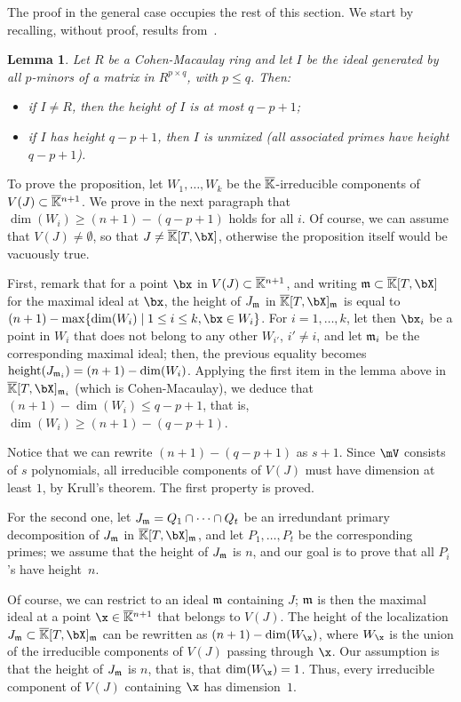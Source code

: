 \documentclass[12pt]{article}
\newtheorem{lemma}[definition]{Lemma}
\begin{document}
The proof in the general case occupies the rest of this section. We start by
recalling, without proof, results from~\cite[Section~6]{EN62}.

\begin{lemma}\label{lemma:EN}
  Let $R$ be a Cohen-Macaulay ring and let $I$ be the ideal generated
  by all $p$-minors of a matrix in $R^{p\times q}$,
  with $p \le q$. Then:
  \begin{itemize}
  \item if $I \ne R$, then the height of $I$ is at most $q-p+1$;
  \item if $I$ has height $q-p+1$, then $I$ is unmixed (all associated
    primes have height $q-p+1$).
\end{itemize}
\end{lemma}

To prove the proposition, let $W_1,\dots,W_k$ be the
$\overline{\mathbb{K}}$-irreducible components of $V(J)\subset \overline{\mathbb{K}}{}^{n+1}$.  We
prove in the next paragraph that $\dim(W_i) \ge (n+1) -(q-p+1)$ holds
for all $i$. Of course, we can assume that $V(J)\ne \emptyset$, so
that $J \ne \KKbar[T,\bX]$, otherwise the proposition itself would be
vacuously true.

First, remark that for a point $\bx$ in $V(J)\subset \overline{\mathbb{K}}{}^{n+1}$,
and writing $\m \subset \KKbar[T,\bX]$ for the maximal ideal at $\bx$,
the height of $J_{\mathfrak{m}}$ in $\KKbar[T,\bX]_\m$ is equal to $(n+1)-\max\{
\dim(W_i) \mid 1 \le i \le k, \bx \in W_i\}$. For $i=1,\dots,k$, let
then $\bx_i$ be a point in $W_i$ that does not belong to any other
$W_{i'}$, $i' \ne i$, and let $\mathfrak{m}_i$ be the corresponding maximal
ideal; then, the previous equality becomes ${\rm
  height}(J_{\mathfrak{m}_i})=(n+1)-\dim(W_i)$.  Applying the first item in the
lemma above in $\KKbar[T,\bX]_{\m_i}$ (which is Cohen-Macaulay), we
deduce that $(n+1)-\dim(W_i) \le q-p+1$, that is, $\dim(W_i) \ge (n+1)
-(q-p+1)$.

Notice that we can rewrite $(n+1)-(q-p+1)$ as $s+1$.  Since $\mV$
consists of $s$ polynomials, all irreducible components of $V(J)$ must
have dimension at least $1$, by Krull's theorem. The first property
 is proved.

For the second one, let $J_{\mathfrak{m}}=Q_1 \cap \cdots \cap Q_t$ be an
irredundant primary decomposition of $J_{\mathfrak{m}}$ in $\KKbar[T,\bX]_\m$, and
let $P_1,\dots,P_t$ be the corresponding primes; we assume that the
height of $J_{\mathfrak{m}}$ is $n$, and our goal is to prove that all $P_i$'s
have height~$n$.

Of course, we can restrict to an ideal $\mathfrak{m}$ containing $J$; $\mathfrak{m}$ is
then the maximal ideal at a point $\x \in \KKbar{}^{n+1}$ that belongs
to $V(J)$. The height of the localization
$J_\m \subset \KKbar[T,\bX]_\m$ can be rewritten as
$(n+1)-\dim(W_\x)$, where $W_\x$ is the union of the irreducible
components of $V(J)$ passing through $\x$. Our assumption 
is that the height of $J_{\mathfrak{m}}$ is $n$, that is, that
$\dim(W_\x)=1$. Thus, every irreducible component of $V(J)$ containing
$\x$ has dimension~$1$.
\end{document}
